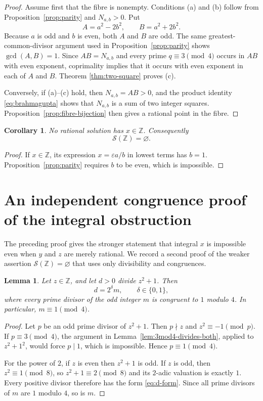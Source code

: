 \documentclass[11pt]{article}
\numberwithin{equation}{section}
\newtheorem{lemma}[theorem]{Lemma}
\newtheorem{corollary}[theorem]{Corollary}
\theoremstyle{definition}
\theoremstyle{remark}
\newcommand{\Z}{\mathbb{Z}}
\newcommand{\eps}{\varepsilon}
\begin{document}
\begin{proof}
Assume first that the fibre is nonempty.  Conditions (a) and (b) follow
from Proposition~\ref{prop:parity} and $N_{a,b}>0$.  Put
\[
 A=a^{2}-2b^{2},
 \qquad
 B=a^{2}+2b^{2}.
\]
Because $a$ is odd and $b$ is even, both $A$ and $B$ are odd.  The same
greatest-common-divisor argument used in Proposition~\ref{prop:parity}
shows $\gcd(A,B)=1$.  Since $AB=N_{a,b}$ and every prime
$q\equiv3\pmod4$ occurs in $AB$ with even exponent, coprimality implies
that it occurs with even exponent in each of $A$ and $B$.  Theorem
\ref{thm:two-square} proves (c).

Conversely, if (a)--(c) hold, then $N_{a,b}=AB>0$, and the product
identity \eqref{eq:brahmagupta} shows that $N_{a,b}$ is a sum of two
integer squares.  Proposition~\ref{prop:fibre-bijection} then gives a
rational point in the fibre.
\end{proof}

\begin{corollary}\label{cor:no-integral-x}
No rational solution has $x\in\Z$.  Consequently
\[
 \mathcal S(\Z)=\varnothing.
\]
\end{corollary}

\begin{proof}
If $x\in\Z$, its expression $x=\eps a/b$ in lowest terms has $b=1$.
Proposition~\ref{prop:parity} requires $b$ to be even, which is
impossible.
\end{proof}

\section{An independent congruence proof of the integral obstruction}

The preceding proof gives the stronger statement that integral $x$ is
impossible even when $y$ and $z$ are merely rational.  We record a
second proof of the weaker assertion $\mathcal S(\Z)=\varnothing$ that
uses only divisibility and congruences.

\begin{lemma}\label{lem:divisor-z2plus1}
Let $z\in\Z$, and let $d>0$ divide $z^{2}+1$.  Then
\begin{equation}\label{eq:d-form}
 d=2^{\delta}m,
 \qquad \delta\in\{0,1\},
\end{equation}
where every prime divisor of the odd integer $m$ is congruent to $1$
modulo $4$.  In particular, $m\equiv1\pmod4$.
\end{lemma}

\begin{proof}
Let $p$ be an odd prime divisor of $z^{2}+1$.  Then $p\nmid z$ and
$z^{2}\equiv-1\pmod p$.  If $p\equiv3\pmod4$, the argument in
Lemma~\ref{lem:3mod4-divides-both}, applied to $z^{2}+1^{2}$, would force
$p\mid1$, which is impossible.  Hence $p\equiv1\pmod4$.

For the power of $2$, if $z$ is even then $z^{2}+1$ is odd.  If $z$ is
odd, then $z^{2}\equiv1\pmod8$, so $z^{2}+1\equiv2\pmod8$ and its
$2$-adic valuation is exactly $1$.  Every positive divisor therefore
has the form \eqref{eq:d-form}.  Since all prime divisors of $m$ are
$1$ modulo $4$, so is $m$.
\end{proof}
\end{document}

